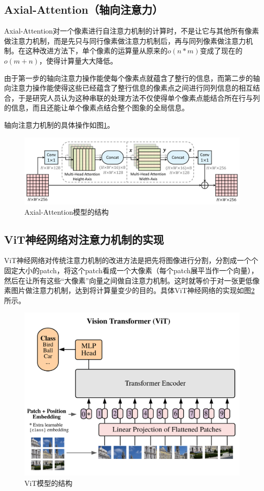 \subsection{Axial-Attention（轴向注意力）}
 Axial-Attention对一个像素进行自注意力机制的计算时，不是让它与其他所有像素做注意力机制，而是先只与同行像素做注意力机制后，再与同列像素做注意力机制。在这种改进方法下，单个像素的运算量从原来的$o(n*m)$变成了现在的$o(m+n)$，使得计算量大大降低。
 
 由于第一步的轴向注意力操作能使每个像素点就蕴含了整行的信息，而第二步的轴向注意力操作能使得这些已经蕴含了整行信息的像素点之间进行同列信息的相互结合，于是研究人员认为这种串联的处理方法不仅使得单个像素点能结合所在行与列的信息，而且还能让单个像素点结合整个图象的全局信息。
 
 轴向注意力机制的具体操作如图\ref{img313}。
 \begin{figure}[h]
 	\centering
 	\includegraphics[width=0.75\columnwidth]{image/chap03/img313.png}
 	\caption{Axial-Attention模型的结构\cite{wang2020axial}}
 	\label{img313}
 \end{figure}

\subsection{ViT神经网络对注意力机制的实现}
 ViT神经网络对传统注意力机制的改进方法是把先将图像进行分割，分割成一个个固定大小的patch，将这个patch看成一个大像素（每个patch展平当作一个向量），然后在让所有这些“大像素”向量之间做自注意力机制。这时就等价于对一张更低像素图片做注意力机制，达到将计算量变少的目的。具体ViT神经网络的实现如图\ref{img314}所示。
 
 \begin{figure}[h]
 	\centering
 	\includegraphics[width=0.5\columnwidth]{image/chap03/img314.png}
 	\caption{ViT模型的结构\cite{dosovitskiy2020image}}
 	\label{img314}
 \end{figure}

